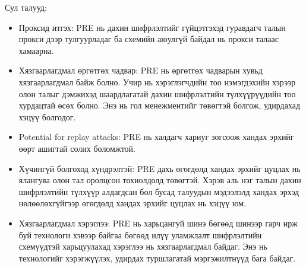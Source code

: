 Сул талууд:
\begin{itemize}
    \item Проксид итгэх: PRE нь дахин шифрлэлтийг гүйцэтгэхэд гуравдагч талын прокси дээр тулгуурладаг ба схемийн аюулгүй байдал нь прокси талаас хамаарна.
    \item Хязгаарлагдмал өргөтгөх чадвар: PRE нь өргөтгөх чадварын хувьд хязгаарлагдмал байж болно. Учир нь хэрэглэгчдийн тоо нэмэгдэхийн хэрээр олон талыг дэмжихэд шаардлагатай дахин шифрлэлтийн түлхүүрүүдийн тоо хурдацтай өсөх болно. Энэ нь гол менежментийг төвөгтэй болгож, удирдахад хэцүү болгодог.
    \item Potential for replay attacks: PRE нь халдагч хариуг зогсоож хандах эрхийг өөрт ашигтай солих боломжтой.
    \item Хүчингүй болгоход хүндрэлтэй: PRE дахь өгөгдөлд хандах эрхийг цуцлах нь ялангуяа олон тал оролцсон тохиолдолд төвөгтэй. Хэрэв аль нэг талын дахин шифрлэлтийн түлхүүр алдагдсан бол бусад талуудын мэдээлэлд хандах эрхэд нөлөөлөхгүйгээр өгөгдөлд хандах эрхийг цуцлах нь хэцүү юм.
    \item Хязгаарлагдмал хэрэглээ: PRE нь харьцангуй шинэ бөгөөд шинээр гарч ирж буй технологи хэвээр байгаа бөгөөд илүү уламжлалт шифрлэлтийн схемүүдтэй харьцуулахад хэрэглээ нь хязгаарлагдмал байдаг. Энэ нь технологийг хэрэгжүүлэх, удирдах туршлагатай мэргэжилтнүүд бага байдаг.
\end{itemize}

